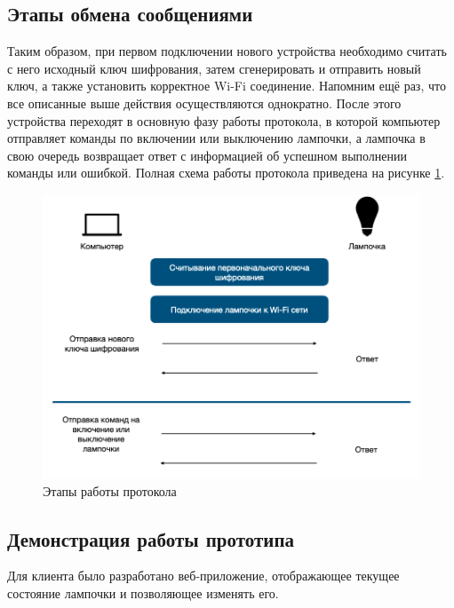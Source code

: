 	\subsection{Этапы обмена сообщениями}
	
	Таким образом, при первом подключении нового устройства необходимо считать с него исходный ключ
	шифрования, затем сгенерировать и отправить новый ключ, а также установить корректное Wi-Fi
	соединение. Напомним ещё раз, что все описанные выше действия осуществляются однократно. После
	этого устройства переходят в основную фазу работы протокола, в которой компьютер отправляет команды
	по включении или выключению лампочки, а лампочка в свою очередь возвращает ответ с информацией
	об успешном выполнении команды или ошибкой. Полная схема работы протокола приведена на 
	рисунке \ref{fig4.5}.
	
	\begin{figure}[h]
		\centering
		\includegraphics[scale=0.5]{resources/work-scheme}
		\caption{Этапы работы протокола}
		\label{fig4.5}
	\end{figure}
	
	\subsection{Демонстрация работы прототипа}
	
	Для клиента было разработано веб-приложение, отображающее текущее состояние лампочки и позволяющее
	изменять его.
	
